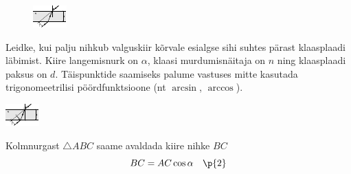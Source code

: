 
\begin{figure}
  \vspace{-2em}
  \begin{center}
    \includegraphics[width=1\linewidth]{2023-v2g-06-yl.pdf}
  \end{center}
  \vspace{-2em}
\end{figure}

Leidke, kui palju nihkub valguskiir kõrvale esialgse sihi suhtes pärast klaasplaadi läbimist. Kiire langemisnurk on $\alpha$, klaasi murdumisnäitaja on $n$ ning klaasplaadi paksus on $d$. Täispunktide saamiseks palume vastuses mitte kasutada trigonomeetrilisi pöördfunktsioone (nt $\arcsin$, $\arccos$).


\hint

\solu
\begin{center}
\includegraphics[width=0.5\linewidth]{2023-v2g-06-sol.pdf}
\end{center}
  
Kolmnurgast $\triangle{ABC}$ saame avaldada kiire nihke $BC$\\
\[ BC = AC \cos{\alpha} \quad \p{2}\]

